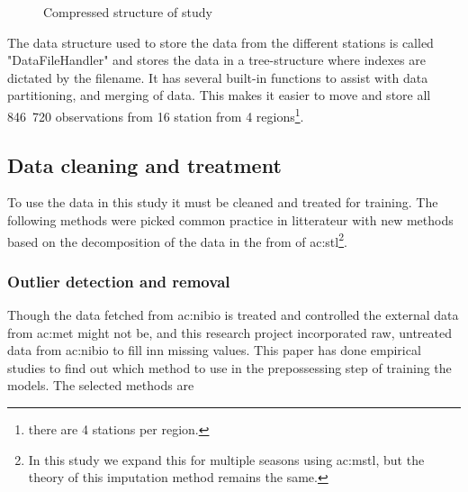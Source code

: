\begin{figure}[ht]
	\caption{Compressed structure of study}
\end{figure}

The data structure used to store the data from the different stations is called "DataFileHandler" and stores the data in a tree-structure where indexes are dictated by the filename. It has several built-in functions to assist with data partitioning, and merging of data. This makes it easier to move and store all 846 720 observations from 16 station from 4 regions\footnote{there are 4 stations per region.}. 

\subsection{Data cleaning and treatment}

To use the data in this study it must be cleaned and treated for training. The following methods were picked common practice in litterateur with new methods based on the decomposition of the data in the from of \acrfull{ac:stl}\cite{cleveland_stl_1990}\footnote{In this study we expand this for multiple seasons using \acrfull{ac:mstl}\cite{bandara_mstl_2021}, but the theory of this imputation method remains the same.}.

\subsubsection{Outlier detection and removal}

Though the data fetched from \acrshort{ac:nibio} is treated and controlled the external data from \acrshort{ac:met} might not be, and this research project incorporated raw, untreated data from \acrshort{ac:nibio} to fill inn missing values. This paper has done empirical studies to find out which method to use in the prepossessing step of training the models. The selected methods are

